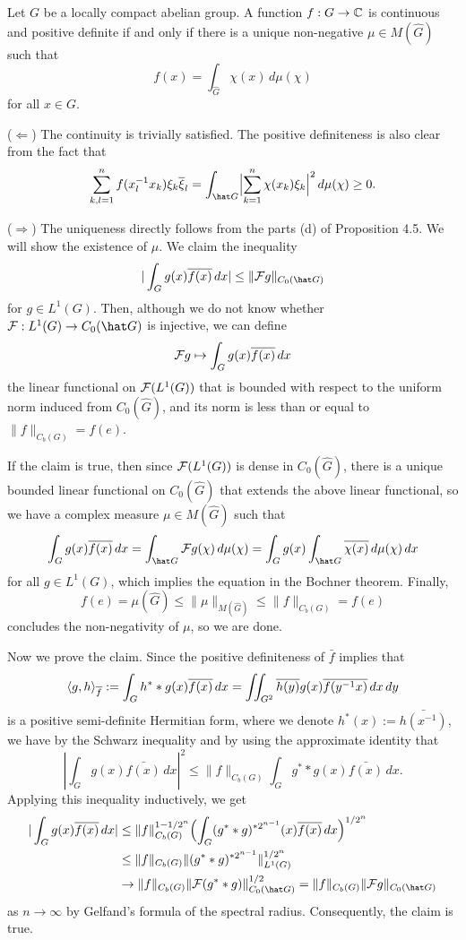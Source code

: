 \documentclass[a4paper]{article}
\begin{document}
\begin{thm}
Let $G$ be a locally compact abelian group.
A function $f:G\to\mathbb{C}$ is continuous and positive definite if and only if there is a unique non-negative $\mu\in M(\hat G)$ such that 
\[f(x)=\int_{\hat G}\chi(x)\,d\mu(\chi)\]
for all $x\in G$.
\end{thm}
\begin{pf}
($\Leftarrow$)
The continuity is trivially satisfied.
The positive definiteness is also clear from the fact that
\[\sum_{k,l=1}^nf(x_l^{-1}x_k)\xi_k\bar\xi_l=\int_{\hat G}\Bigl|\sum_{k=1}^n\chi(x_k)\xi_k\Bigr|^2\,d\mu(\chi)\ge0.\]

($\Rightarrow$)
The uniqueness directly follows from the parts (d) of Proposition 4.5.
We will show the existence of $\mu$.
We claim the inequality
\[|\int_Gg(x)\bar{f(x)}\,dx|\le\|\cF g\|_{C_0(\hat G)}\]
for $g\in L^1(G)$.
Then, although we do not know whether $\cF:L^1(G)\to C_0(\hat G)$ is injective, we can define
\[\mathcal{F} g\mapsto\int_Gg(x)\overline{f(x)}\,dx\]
the linear functional on $\mathcal{F}(L^1(G))$ that is bounded with respect to the uniform norm induced from $C_0(\hat G)$, and its norm is less than or equal to $\|f\|_{C_b(G)}=f(e)$.

If the claim is true, then since $\mathcal{F}(L^1(G))$ is dense in $C_0(\hat G)$, there is a unique bounded linear functional on $C_0(\hat G)$ that extends the above linear functional, so we have a complex measure $\mu\in M(\hat G)$ such that
\[\int_Gg(x)\bar{f(x)}\,dx=\int_{\hat G}\cF g(\chi)\,d\mu(\chi)=\int_G g(x)\int_{\hat G}\bar{\chi(x)}\,d\mu(\chi)\,dx\]
for all $g\in L^1(G)$, which implies the equation in the Bochner theorem.
Finally,
\[f(e)=\mu(\hat G)\le\|\mu\|_{M(\hat G)}\le\|f\|_{C_b(G)}=f(e)\] concludes the non-negativity of $\mu$, so we are done.

Now we prove the claim.
Since the positive definiteness of $\bar f$ implies that
\[\langle g,h\rangle_{\overline f}:=\int_Gh^**g(x)\overline{f(x)}\,dx=\iint_{G^2}\overline{h(y)}g(x)\overline{f(y^{-1}x)}\,dx\,dy\]
is a positive semi-definite Hermitian form, where we denote $h^*(x):=\bar{h(x^{-1})}$, we have by the Schwarz inequality and by using the approximate identity that
\[|\int_Gg(x)\bar{f(x)}\,dx|^2\le\|f\|_{C_b(G)}\int_G g^**g(x)\bar{f(x)}\,dx.\]
Applying this inequality inductively, we get
\begin{align*}
|\int_Gg(x)\bar{f(x)}\,dx|
&\le\|f\|_{C_b(G)}^{1-1/2^n}\Bigl(\int_G(g^**g)^{*2^{n-1}}(x)\bar{f(x)}\,dx\Bigr)^{1/2^n}\\
&\le\|f\|_{C_b(G)}\|(g^**g)^{*2^{n-1}}\|_{L^1(G)}^{1/2^n}\\
&\to\|f\|_{C_b(G)}\|\cF(g^**g)\|_{C_0(\hat G)}^{1/2}=\|f\|_{C_b(G)}\|\cF g\|_{C_0(\hat G)}
\end{align*}
as $n\to\infty$ by Gelfand's formula of the spectral radius.
Consequently, the claim is true.
\end{pf}
\end{document}

